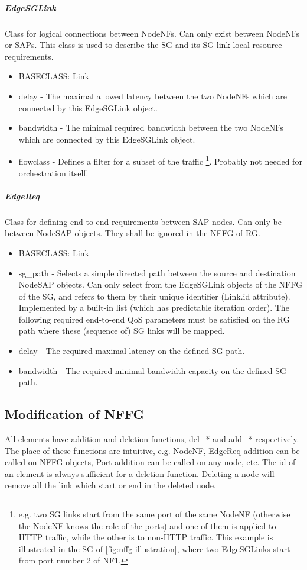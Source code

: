 \documentclass[a4paper,10pt]{scrartcl}
\begin{document}
\subparagraph{EdgeSGLink}
Class for logical connections between NodeNFs. Can only exist between NodeNFs or SAPs.
This class is used to describe the SG and its SG-link-local resource requirements.
\begin{itemize}
\item BASECLASS: Link
\item delay - The maximal allowed latency between the two NodeNFs which are connected by this EdgeSGLink object.
\item bandwidth - The minimal required bandwidth between the two NodeNFs which are connected by this EdgeSGLink object.
\item flowclass - Defines a filter for a subset of the traffic 
\footnote{e.g. two SG links start from the same port of the same NodeNF (otherwise the NodeNF knows the role of the ports)
and one of  them is applied to HTTP traffic, while the other is to non-HTTP traffic. 
This example is illustrated in the SG of \ref{fig:nffg-illustration}, where two EdgeSGLinks start from port number 2 of NF1.}. 
Probably not needed for orchestration itself.
\end{itemize}

\subparagraph{EdgeReq}
Class for defining end-to-end requirements between SAP nodes. Can only be between NodeSAP objects.
They shall be ignored in the NFFG of RG.
\begin{itemize}
\item BASECLASS: Link
\item sg\_path - Selects a simple directed path between the source and destination NodeSAP objects. 
Can only select from the EdgeSGLink objects of the NFFG of the SG, 
and refers to them by their unique identifier (Link.id attribute).
Implemented by a built-in list (which has predictable iteration order). 
The following required end-to-end QoS parameters must be satisfied on the RG path where these
(sequence of) SG links will be mapped.
\item delay - The required maximal latency on the defined SG path.
\item bandwidth - The required minimal bandwidth capacity on the defined SG path.
\end{itemize}

\subsection{Modification of NFFG}

All elements have addition and deletion functions, del\_* and add\_* respectively. 
The place of these functions are intuitive, 
e.g. NodeNF, EdgeReq addition can be called on NFFG objects, Port addition can be called on any node, etc.
The id of an element is always sufficient for a deletion function. 
Deleting a node will remove all the link which start or end in the deleted node.
\end{document}

